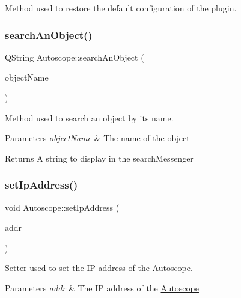 Method used to restore the default configuration of the plugin. 

\mbox{\label{class_autoscope_af1d803331f5ab5f5ff5d3839df8952c7}} 
\subsubsection{\texorpdfstring{searchAnObject()}{searchAnObject()}}
{\footnotesize\ttfamily Q\+String Autoscope\+::search\+An\+Object (\begin{DoxyParamCaption}\item[{Q\+String}]{object\+Name }\end{DoxyParamCaption})}



Method used to search an object by it\textquotesingle{}s name. 


\begin{DoxyParams}{Parameters}
{\em object\+Name} & The name of the object \\
\hline
\end{DoxyParams}
\begin{DoxyReturn}{Returns}
A string to display in the search\+Messenger 
\end{DoxyReturn}
\mbox{\label{class_autoscope_aad5b62b7a114ef8755923067e14f9dd8}} 
\subsubsection{\texorpdfstring{setIpAddress()}{setIpAddress()}}
{\footnotesize\ttfamily void Autoscope\+::set\+Ip\+Address (\begin{DoxyParamCaption}\item[{Q\+String}]{addr }\end{DoxyParamCaption})\hspace{0.3cm}{\ttfamily [inline]}}



Setter used to set the IP address of the \mbox{\hyperlink{class_autoscope}{Autoscope}}. 


\begin{DoxyParams}{Parameters}
{\em addr} & The IP address of the \mbox{\hyperlink{class_autoscope}{Autoscope}} \\
\hline
\end{DoxyParams}
\mbox{\label{class_autoscope_acda88ddee4fb3fbd0333717c0f140e54}} 
